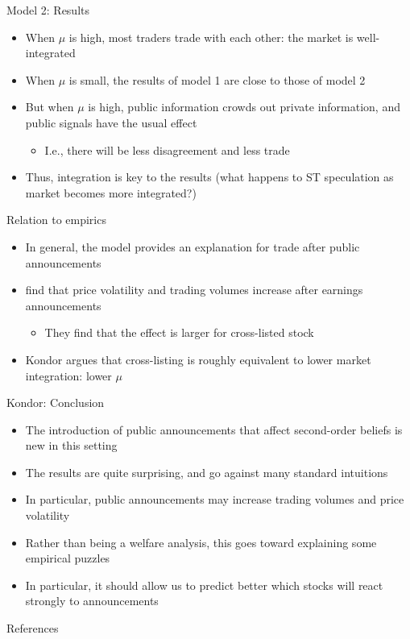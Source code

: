 \documentclass[english,10pt
,aspectratio=169
]{beamer}
\begin{document}
\begin{frame}{Model 2: Results}
	\begin{itemize}
		\item When $\mu$ is high, most traders trade with each other: the market is well-integrated
		\item When $\mu$ is small, the results of model 1 are close to those of model 2
		\item But when $\mu$ is high, public information crowds out private information, and public signals have the usual effect
		\begin{itemize}
			\item I.e., there will be less disagreement and less trade
		\end{itemize}
		\item Thus, integration is key to the results (what happens to ST speculation as market becomes more integrated?)
	\end{itemize}
\end{frame}


\begin{frame}{Relation to empirics}
	\begin{itemize}
		\item In general, the model provides an explanation for trade after public announcements
		\item \citet*{bailey_economic_2006} find that price volatility and trading volumes increase after earnings announcements
		\begin{itemize}
			\item They find that the effect is larger for cross-listed stock
		\end{itemize}
		\item Kondor argues that cross-listing is roughly equivalent to lower market integration: lower $\mu$
	\end{itemize}
\end{frame}


\begin{frame}{Kondor: Conclusion}
	\begin{itemize}
		\item The introduction of public announcements that affect second-order beliefs is new in this setting
		\item The results are quite surprising, and go against many standard intuitions
		\item In particular, public announcements may increase trading volumes and price volatility
		\item Rather than being a welfare analysis, this goes toward explaining some empirical puzzles 
		\item In particular, it should allow us to predict better which stocks will react strongly to announcements
	\end{itemize}
\end{frame}

\appendix
\begin{frame}[allowframebreaks]{References}
	
	
\end{frame}
\end{document}
